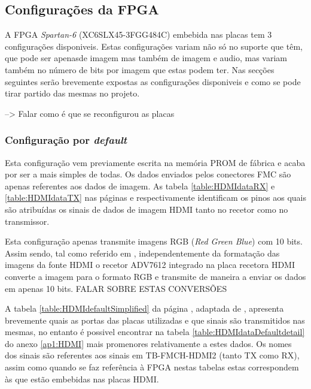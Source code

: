 \subsection{Configurações da FPGA} \label{subsec:HDMIconfig}

A FPGA \textit{Spartan-6} (XC6SLX45-3FGG484C) embebida nas placas tem 3 configurações disponiveis. Estas configurações variam não só no suporte que têm, que pode ser apenasde imagem mas também de imagem e audio, mas variam também no número de bits por imagem que estas podem ter. Nas secções seguintes serão brevemente expostas as configurações disponiveis e como se pode tirar partido das mesmas no projeto.

--> Falar como é que se reconfigurou as placas
\subsubsection{Configuração por \textit{default}} \label{subsubsec:HDMIconfigdefault}

Esta configuração vem previamente escrita na memória PROM de fábrica e acaba por ser a mais simples de todas. Os dados enviados pelos conectores FMC são apenas referentes aos dados de imagem. As tabela \ref{table:HDMIdataRX} e \ref{table:HDMIdataTX} nas páginas \pageref{table:HDMIdataRX} e \pageref{table:HDMIdataTX} respectivamente identificam os pinos aos quais são atribuídas os sinais de dados de imagem HDMI tanto no recetor como no transmissor.

Esta configuração apenas transmite imagens RGB (\textit{Red Green Blue}) com 10 bits. Assim sendo, tal como referido em \cite{R009}, independentemente da formatação das imagens da fonte HDMI o recetor ADV7612 integrado na placa recetora HDMI converte a imagem para o formato RGB e transmite de maneira a enviar os dados em apenas 10 bits.  FALAR SOBRE ESTAS CONVERSÕES

A tabela \ref{table:HDMIdefaultSimplified} da página \pageref{table:HDMIdefaultSimplified}, adaptada de \cite{R009}, apresenta brevemente quais as portas das placas utilizadas e que sinais são transmitidos nas mesmas, no entanto é possivel encontrar na tabela \ref{table:HDMIdataDefaultdetail} do anexo \ref{ap1:HDMI} mais promenores relativamente a estes dados. Os nomes dos sinais são referentes aos sinais em TB-FMCH-HDMI2 (tanto TX como RX), assim como quando se faz referência à FPGA nestas tabelas estas correspondem às que estão embebidas nas placas HDMI. 


